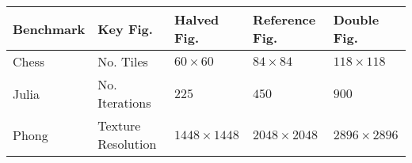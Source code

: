 
\begin{tabular}{lllll}
	Benchmark	& Key Fig.				& Halved Fig.		& Reference Fig.	& Double Fig.		\\ \hline
	Chess		& No. Tiles				& $60\times60$		& $84\times84$		& $118\times118$	\\
	Julia		& No. Iterations		& $225$				& $450$				& $900$				\\
	Phong		& Texture Resolution	& $1448\times1448$	& $2048\times2048$	& $2896\times2896$	\\
\end{tabular}
